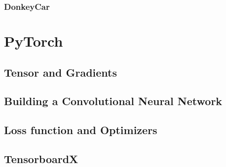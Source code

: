 \subsubsection{Donkey\textregistered Car}



\section{PyTorch}





\subsection{Tensor and Gradients}



\subsection{Building a Convolutional Neural Network}



\subsection{Loss function and Optimizers}



\subsection{TensorboardX}


